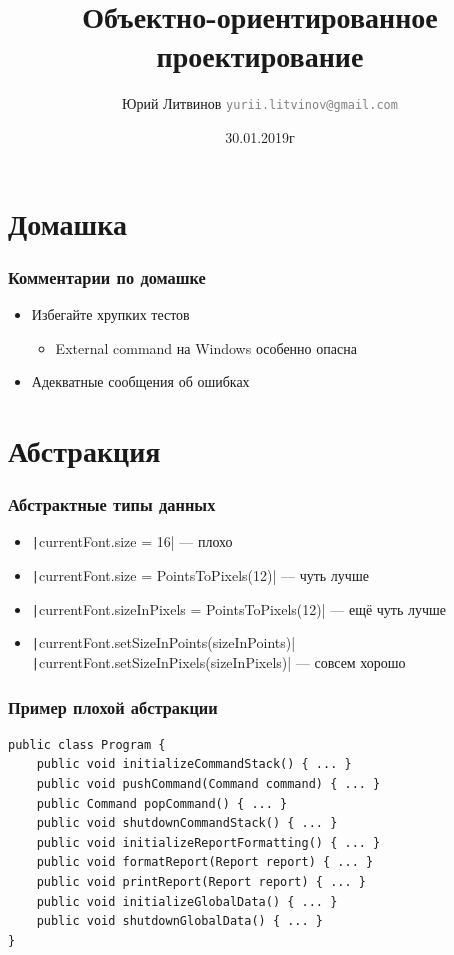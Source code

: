 \documentclass[xetex,mathserif,serif]{beamer}
\title{Объектно-ориентированное проектирование}
\author[Юрий Литвинов]{Юрий Литвинов \newline \textcolor{gray}{\small\texttt{yurii.litvinov@gmail.com}}}
\date{30.01.2019г}
\begin{document}
	\frame{\titlepage}

	\section{Домашка}

	\begin{frame}
		\frametitle{Комментарии по домашке}
		\begin{itemize}
			\item Избегайте хрупких тестов
			\begin{itemize}
				\item External command на Windows особенно опасна
			\end{itemize}
			\item Адекватные сообщения об ошибках
		\end{itemize}
	\end{frame}

	\section{Абстракция}

	\begin{frame}
		\frametitle{Абстрактные типы данных}
		\begin{itemize}
			\item \texttt|currentFont.size = 16| --- плохо
			\item \texttt|currentFont.size = PointsToPixels(12)| --- чуть лучше
			\item \texttt|currentFont.sizeInPixels = PointsToPixels(12)| --- ещё чуть лучше
			\item \texttt|currentFont.setSizeInPoints(sizeInPoints)| \newline
					\texttt|currentFont.setSizeInPixels(sizeInPixels)| --- совсем хорошо
		\end{itemize}
	\end{frame}

	\begin{frame}[fragile]
		\frametitle{Пример плохой абстракции}
		\begin{verbatim}
public class Program {
    public void initializeCommandStack() { ... }
    public void pushCommand(Command command) { ... }
    public Command popCommand() { ... }
    public void shutdownCommandStack() { ... }
    public void initializeReportFormatting() { ... }
    public void formatReport(Report report) { ... }
    public void printReport(Report report) { ... }
    public void initializeGlobalData() { ... }
    public void shutdownGlobalData() { ... }
}
		\end{verbatim}
	\end{frame}
\end{document}
